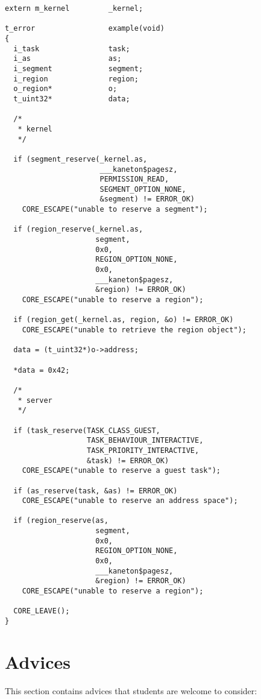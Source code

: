 \begin{verbatim}
extern m_kernel         _kernel;

t_error                 example(void)
{
  i_task                task;
  i_as                  as;
  i_segment             segment;
  i_region              region;
  o_region*             o;
  t_uint32*             data;

  /*
   * kernel
   */

  if (segment_reserve(_kernel.as,
                      ___kaneton$pagesz,
                      PERMISSION_READ,
                      SEGMENT_OPTION_NONE,
                      &segment) != ERROR_OK)
    CORE_ESCAPE("unable to reserve a segment");

  if (region_reserve(_kernel.as,
                     segment,
                     0x0,
                     REGION_OPTION_NONE,
                     0x0,
                     ___kaneton$pagesz,
                     &region) != ERROR_OK)
    CORE_ESCAPE("unable to reserve a region");

  if (region_get(_kernel.as, region, &o) != ERROR_OK)
    CORE_ESCAPE("unable to retrieve the region object");

  data = (t_uint32*)o->address;

  *data = 0x42;

  /*
   * server
   */

  if (task_reserve(TASK_CLASS_GUEST,
                   TASK_BEHAVIOUR_INTERACTIVE,
                   TASK_PRIORITY_INTERACTIVE,
                   &task) != ERROR_OK)
    CORE_ESCAPE("unable to reserve a guest task");

  if (as_reserve(task, &as) != ERROR_OK)
    CORE_ESCAPE("unable to reserve an address space");

  if (region_reserve(as,
                     segment,
                     0x0,
                     REGION_OPTION_NONE,
                     0x0,
                     ___kaneton$pagesz,
                     &region) != ERROR_OK)
    CORE_ESCAPE("unable to reserve a region");

  CORE_LEAVE();
}
\end{verbatim}

%
%

\section{Advices}

This section contains advices that students are welcome to consider:


